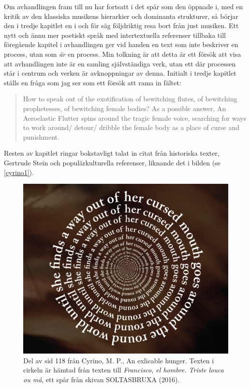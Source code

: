 \documentclass[11pt]{article}
\begin{document}
Om avhandlingen fram till nu har fortsatt i det spår som den öppnade i, med en kritik av den klassiska musikens hierarkier och dominanta strukturer, så börjar den i tredje kapitlet en i och för säg följdriktig resa bort från just musiken. Ett nytt och ännu mer poetiskt språk med intertextuella referenser tillbaka till föregående kapitel i avhandlingen ger vid handen en text som inte beskriver en process, utan som \emph{är} en process. Min tolkning är att detta är ett försök att visa att avhandlingen inte är en samling självständiga verk, utan ett där processen står i centrum och verken är avknoppningar av denna. Initialt i tredje kapitlet ställs en fråga som jag ser som ett försök att rama in fältet:

\begin{quote}
How to speak out of the exotification of bewitching flutes, of
bewitching prophetesses, of bewitching female bodies? As a
possible answer, An Aeroelastic Flutter spins around the tragic
female voice, searching for ways to work around/ detour/
dribble the female body as a place of curse and punishment. \citep[s. 80]{Cyrino2019}
\end{quote}
Resten av kapitlet ringar bokstavligt talat in citat från historiska texter, Gertrude Stein och populärkulturella referenser, liknande det i bilden (se \ref{cyrino1}).

\label{cyrino1}
\begin{figure}[htbp]
\centering
\includegraphics[width=.9\linewidth]{images/2020-11-03_20-04-54_screenshot.png}
\caption{Del av sid 118 från Cyrino, M. P., An exlicable hunger. Texten i cirkeln är hämtad från texten till  \emph{Francisco, el hombre. Triste louca ou má}, ett spår från skivan SOLTASBRUXA (2016).}
\end{figure}
\end{document}
